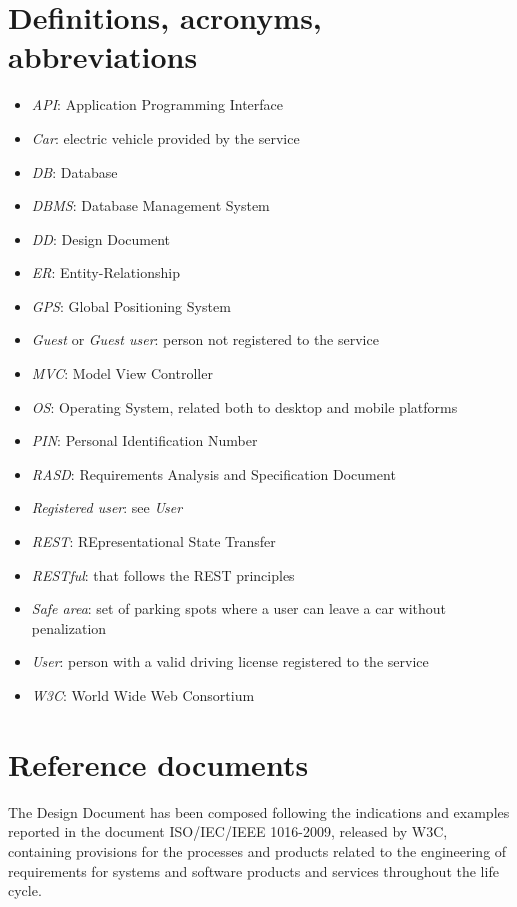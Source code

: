 \section{Definitions, acronyms, abbreviations}
\begin{itemize}
	\item \emph{API}: Application Programming Interface
	\item \emph{Car}: electric vehicle provided by the service
	\item \emph{DB}: Database
	\item \emph{DBMS}: Database Management System
	\item \emph{DD}: Design Document
	\item \emph{ER}: Entity-Relationship
	\item \emph{GPS}: Global Positioning System
	\item \emph{Guest} or \emph{Guest user}: person not registered to the service
	\item \emph{MVC}: Model View Controller
	\item \emph{OS}: Operating System, related both to desktop and mobile platforms
	\item \emph{PIN}: Personal Identification Number
	\item \emph{RASD}: Requirements Analysis and Specification Document
	\item \emph{Registered user}: see \emph{User}
	\item \emph{REST}: REpresentational State Transfer
	\item \emph{RESTful}: that follows the REST principles
	\item \emph{Safe area}: set of parking spots where a user can leave a car without penalization 
	\item \emph{User}: person with a valid driving license registered to the service
	\item \emph{W3C}: World Wide Web Consortium
\end{itemize}

\section{Reference documents}
The Design Document has been composed following the indications and examples reported in the document ISO/IEC/IEEE 1016-2009, released by W3C, containing provisions for the processes and products related to the engineering of requirements for systems and software products and services throughout the life cycle.

